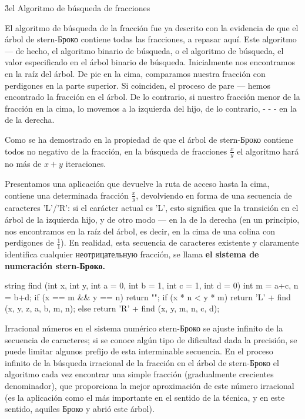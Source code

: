 \h3{el Algoritmo de búsqueda de fracciones}

El algoritmo de búsqueda de la fracción fue ya descrito con la evidencia de que el árbol de stern-Броко contiene todas las fracciones, a repasar aquí. Este algoritmo --- de hecho, el algoritmo binario de búsqueda, o el algoritmo de búsqueda, el valor especificado en el árbol binario de búsqueda. Inicialmente nos encontramos en la raíz del árbol. De pie en la cima, comparamos nuestra fracción con perdigones en la parte superior. Si coinciden, el proceso de pare --- hemos encontrado la fracción en el árbol. De lo contrario, si nuestro fracción menor de la fracción en la cima, lo movemos a la izquierda del hijo, de lo contrario, - - - en la de la derecha.

Como se ha demostrado en la propiedad de que el árbol de stern-Броко contiene todos no negativo de la fracción, en la búsqueda de fracciones $\frac{x}{y}$ el algoritmo hará no más de $x+y$ iteraciones.

Presentamos una aplicación que devuelve la ruta de acceso hasta la cima, contiene una determinada fracción $\frac{x}{y}$, devolviendo en forma de una secuencia de caracteres 'L'/'R': si el carácter actual es 'L', esto significa que la transición en el árbol de la izquierda hijo, y de otro modo --- en la de la derecha (en un principio, nos encontramos en la raíz del árbol, es decir, en la cima de una colina con perdigones de $\frac{1}{1}$). En realidad, esta secuencia de caracteres existente y claramente identifica cualquier неотрицательную fracción, se llama \bf{el sistema de numeración stern-Броко}.

\code
string find (int x, int y, int a = 0, int b = 1, int c = 1, int d = 0) {
int m = a+c, n = b+d;
if (x == m && y == n)
return "";
if (x * n < y * m)
return 'L' + find (x, y, z, a, b, m, n);
else
return 'R' + find (x, y, m, n, c, d);
}
\endcode

Irracional números en el sistema numérico stern-Броко se ajuste infinito de la secuencia de caracteres; si se conoce algún tipo de dificultad dada la precisión, se puede limitar algunos prefijo de esta interminable secuencia. En el proceso infinito de la búsqueda irracional de la fracción en el árbol de stern-Броко el algoritmo cada vez encontrar una simple fracción (gradualmente crecientes denominador), que proporciona la mejor aproximación de este número irracional (es la aplicación como el más importante en el sentido de la técnica, y en este sentido, aquiles Броко y abrió este árbol).

